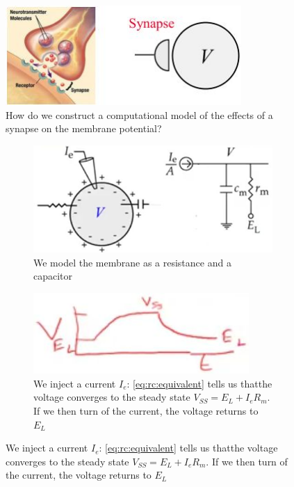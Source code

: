\documentclass[]{article}
\begin{document}
\begin{figure}[H]
	\caption[Construct a computational model of the effects of a synapse.]{How do we construct a computational model of the effects of a synapse on the membrane potential?}
	\includegraphics[width=0.8\textwidth]{want-computational-model}
\end{figure}

\begin{figure}[H]
	\caption[Recall the RC circuit model of the cell]{Recall the RC circuit model of the cell. \cite{dayan2005theoretical}}
	\begin{subfigure}[t]{0.6\textwidth}
		\caption{We model the membrane as a resistance and a capacitor}
		\includegraphics[width=\textwidth]{rc-circuit-model}
	\end{subfigure}
	\begin{subfigure}[t]{0.3\textwidth} 
		\caption{We inject a current $I_e$: \eqref{eq:rc:equivalent} tells us thatthe voltage converges to the steady state $V_{SS}=E_L+I_eR_m$. If we then turn of the current, the voltage returns to $E_L$}
		\includegraphics[width=0.9\textwidth]{voltage-from-rc-model}
	\end{subfigure}
\end{figure}
\end{document}
